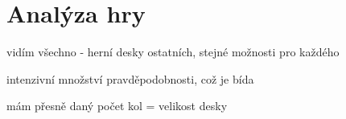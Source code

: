 \chapter{Analýza hry}

vidím všechno - herní desky ostatních, stejné možnosti pro každého

intenzivní množství pravděpodobnosti, což je bída

mám přesně daný počet kol = velikost desky
